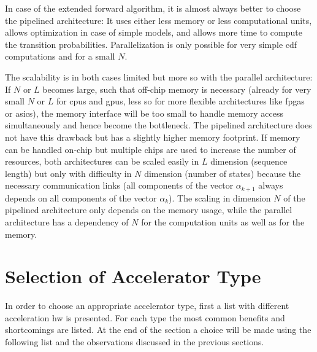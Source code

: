 \documentclass[mscthesis]{usiinfthesis}
\begin{document}
In case of the extended forward algorithm, it is almost always better to choose
the pipelined architecture: It uses either less memory or less computational
units, allows optimization in case of simple models, and allows more time to
compute the transition probabilities. Parallelization is only possible for very
simple \gls{cdf} computations and for a small $N$.

The scalability is in both cases limited but more so with the parallel
architecture: If $N$ or $L$ becomes large, such that off-chip memory is
necessary (already for very small $N$ or $L$ for \glspl{cpu} and \glspl{gpu},
less so for more flexible architectures like \glspl{fpga} or \glspl{asic}), the
memory interface will be too small to handle memory access simultaneously and
hence become the bottleneck. The pipelined architecture does not have this
drawback but has a slightly higher memory footprint. If memory can be handled
on-chip but multiple chips are used to increase the number of resources, both
architectures can be scaled easily in $L$ dimension (sequence length) but only
with difficulty in $N$ dimension (number of states) because the necessary
communication links (all components of the vector $\alpha_{k+1}$ always depends
on all components of the vector $\alpha_k$). The scaling in dimension $N$ of
the pipelined architecture only depends on the memory usage, while the parallel
architecture has a dependency of $N$ for the computation units as well as for
the memory.

\section{Selection of Accelerator Type}
\label{ch:analysis_choice}

In order to choose an appropriate accelerator type, first a list with different
acceleration \gls{hw} is presented. For each type the most common benefits and
shortcomings are listed. At the end of the section a choice will be made using
the following list and the observations discussed in the previous sections.
\end{document}
